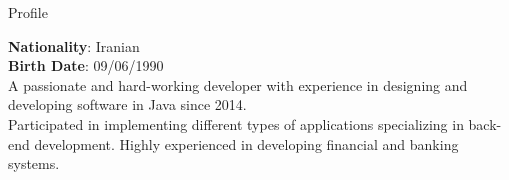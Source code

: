 
\begin{jrsection}[location = sidebar]{Profile}
    \begin{jrdescription}
        {\bfseries Nationality}: Iranian \\
        {\bfseries Birth Date}: 09/06/1990 \\
    A passionate and hard-working developer with experience in designing and developing software in Java since 2014.\\
    Participated in implementing different types of applications specializing in back-end development.
    Highly experienced in developing financial and banking systems.
    \end{jrdescription}
\end{jrsection}
